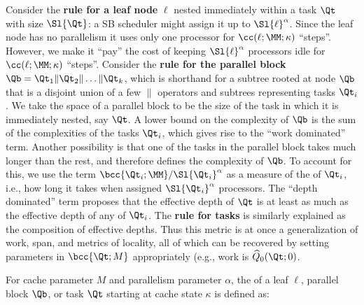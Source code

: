 {Consider the {\bf rule for a leaf node} $\ell$ nested immediately
within a task $\Qt$ with size $\Sl{\Qt}$: a SB scheduler might assign
it up to $\Sl{\ell}^\alpha$.  Since the leaf node has no parallelism
it uses only one processor for $\cc(\ell ; \MM; \kappa)$
``steps''. However, we make it ``pay'' the cost of keeping
$\Sl{\ell}^\alpha$ processors idle for $\cc(\ell; \MM; \kappa)$
``steps''.  Consider the {\bf rule for the parallel block} $\Qb
= \Qt_1\|\Qt_2\|\dots\|\Qt_k$, which is shorthand for a subtree rooted
at node $\Qb$ that is a disjoint union of a few $\parallel$ operators
and subtrees representing tasks $\Qt_i$.  We take the space of a
parallel block to be the size of the task in which it is immediately
nested, say $\Qt$. A lower bound on the complexity of $\Qb$ is the sum
of the complexities of the tasks $\Qt_i$, which gives rise to the
``work dominated'' term. Another possibility is that one of the tasks
in the parallel block takes much longer than the rest, and therefore
defines the complexity of $\Qb$.  To account for this, we use the term
${\bcc{\Qt_i;\MM}}/{\Sl{\Qt_i}^\alpha}$ as a measure of
the  of $\Qt_i$, i.e., how long it takes when
assigned $\Sl{\Qt_i}^\alpha$ processors. The ``depth dominated'' term
proposes that the effective depth of $\Qt$ is at least as much as the
effective depth of any of $\Qt_i$.  The {\bf rule for tasks} is
similarly explained as the composition of effective depths.  Thus this
metric is at once a generalization of work, span, and metrics of
locality, all of which can be recovered by setting parameters in
$\bcc{\Qt;M}$ appropriately (e.g., work is $\widehat{Q}_{0}(\Qt;0)$.

\begin{definition}\label{def:qhat}
\vspace{-8pt}
For cache parameter $M$ and parallelism parameter $\alpha$,
the  of a leaf $\ell$, parallel block
$\Qb$, or task $\Qt$ starting at cache state $\kappa$ is defined as:


\end{definition}}
